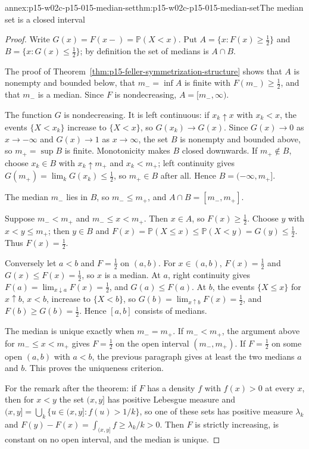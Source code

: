 \begin{annexitem}{annex:p15-w02c-p15-015-median-set}{thm:p15-w02c-p15-015-median-set}{The median set is a closed interval}
\begin{proof}
Write \(G(x)=F(x-)=\mathbb P(X<x)\). Put
\(A=\{x:F(x)\geq\frac12\}\) and \(B=\{x:G(x)\leq\frac12\}\); by
definition the set of medians is \(A\cap B\).

The proof of Theorem~\ref{thm:p15-feller-symmetrization-structure}
shows that \(A\) is nonempty and bounded below, that \(m_-=\inf A\) is
finite with \(F(m_-)\geq\frac12\), and that \(m_-\) is a median. Since
\(F\) is nondecreasing, \(A=[m_-,\infty)\).

The function \(G\) is nondecreasing. It is left continuous: if
\(x_k\uparrow x\) with \(x_k<x\), the events \(\{X<x_k\}\) increase to
\(\{X<x\}\), so \(G(x_k)\to G(x)\). Since \(G(x)\to0\) as
\(x\to-\infty\) and \(G(x)\to1\) as \(x\to\infty\), the set \(B\) is
nonempty and bounded above, so \(m_+=\sup B\) is finite. Monotonicity
makes \(B\) closed downwards. If \(m_+\notin B\), choose
\(x_k\in B\) with \(x_k\uparrow m_+\) and \(x_k<m_+\); left continuity
gives \(G(m_+)=\lim_kG(x_k)\leq\frac12\), so \(m_+\in B\) after all.
Hence \(B=(-\infty,m_+]\).

The median \(m_-\) lies in \(B\), so \(m_-\leq m_+\), and
\(A\cap B=[m_-,m_+]\).

Suppose \(m_-<m_+\) and \(m_-\leq x<m_+\). Then \(x\in A\), so
\(F(x)\geq\frac12\). Choose \(y\) with \(x<y\leq m_+\); then
\(y\in B\) and
\(F(x)=\mathbb P(X\leq x)\leq\mathbb P(X<y)=G(y)\leq\frac12\).
Thus \(F(x)=\frac12\).

Conversely let \(a<b\) and \(F=\frac12\) on \((a,b)\). For
\(x\in(a,b)\), \(F(x)=\frac12\) and \(G(x)\leq F(x)=\frac12\), so
\(x\) is a median. At \(a\), right continuity gives
\(F(a)=\lim_{x\downarrow a}F(x)=\frac12\), and \(G(a)\leq F(a)\). At
\(b\), the events \(\{X\leq x\}\) for \(x\uparrow b\), \(x<b\), increase
to \(\{X<b\}\), so \(G(b)=\lim_{x\uparrow b}F(x)=\frac12\), and
\(F(b)\geq G(b)=\frac12\). Hence \([a,b]\) consists of medians.

The median is unique exactly when \(m_-=m_+\). If \(m_-<m_+\), the
argument above for \(m_-\leq x<m_+\) gives \(F=\frac12\) on the open interval
\((m_-,m_+)\). If \(F=\frac12\) on some open \((a,b)\) with \(a<b\), the
previous paragraph gives at least the two medians \(a\) and \(b\). This
proves the uniqueness criterion.

For the remark after the theorem: if \(F\) has a density \(f\) with
\(f(x)>0\) at every \(x\), then for \(x<y\) the set \((x,y]\) has
positive Lebesgue measure and
\((x,y]=\bigcup_k\{u\in(x,y]:f(u)>1/k\}\), so one of these sets has
positive measure \(\lambda_k\) and
\(F(y)-F(x)=\int_{(x,y]}f\geq\lambda_k/k>0\). Then \(F\) is strictly
increasing, is constant on no open interval, and the median is unique.
\end{proof}
\end{annexitem}


